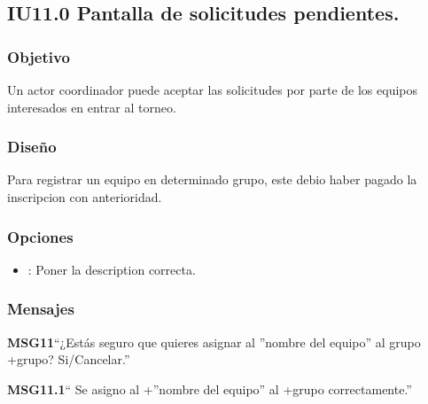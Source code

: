 \subsection{IU11.0 Pantalla de solicitudes pendientes.}

\subsubsection{Objetivo}
	Un actor coordinador puede aceptar las solicitudes por parte de los equipos interesados en entrar al torneo.

\subsubsection{Diseño}
  Para registrar un equipo en determinado grupo, este debio haber pagado la inscripcion con anterioridad.


\subsubsection{Opciones}
\begin{itemize}
	\item {}: Poner la description correcta.
\end{itemize}

\subsubsection{Mensajes}
			\begin{Citemize}
				\item {\bf MSG11}``¿Estás seguro que quieres asignar al ”nombre del equipo” al grupo +grupo? Si/Cancelar.''
				\item {\bf MSG11.1}`` Se asigno al +”nombre del equipo”  al +grupo correctamente.''
			\end{Citemize}